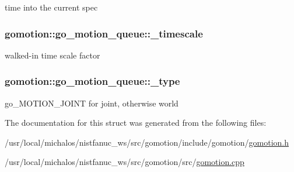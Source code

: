 time into the current spec 

\hypertarget{structgomotion_1_1go__motion__queue_a78ce1642f13b46e810ae781a827408e6}{
\subsubsection[{\-\_\-timescale}]{ gomotion\-::go\-\_\-motion\-\_\-queue\-::\-\_\-timescale}}\label{structgomotion_1_1go__motion__queue_a78ce1642f13b46e810ae781a827408e6}


walked-\/in time scale factor 

\hypertarget{structgomotion_1_1go__motion__queue_a0c5400b47c8a5e5966da98832ddad2dd}{
\subsubsection[{\-\_\-type}]{ gomotion\-::go\-\_\-motion\-\_\-queue\-::\-\_\-type}}\label{structgomotion_1_1go__motion__queue_a0c5400b47c8a5e5966da98832ddad2dd}


go\-\_\-\-M\-O\-T\-I\-O\-N\-\_\-\-J\-O\-I\-N\-T for joint, otherwise world 



The documentation for this struct was generated from the following files\-:\begin{DoxyCompactItemize}
\item 
/usr/local/michalos/nistfanuc\-\_\-ws/src/gomotion/include/gomotion/\hyperlink{gomotion_8h}{gomotion.\-h}\item 
/usr/local/michalos/nistfanuc\-\_\-ws/src/gomotion/src/\hyperlink{gomotion_8cpp}{gomotion.\-cpp}\end{DoxyCompactItemize}
